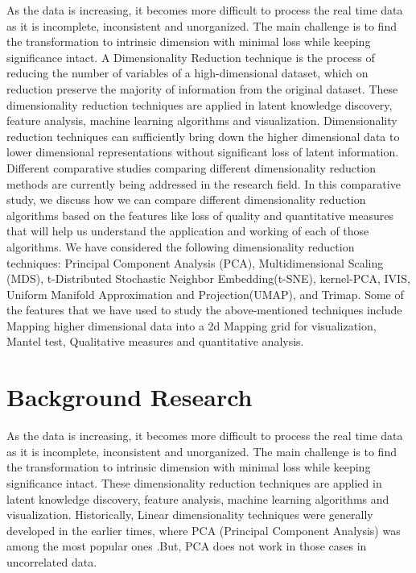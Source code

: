 \documentclass[letterpaper, 10 pt, conference]{ieeeconf}  %
\begin{document}
As the data is increasing, it becomes more difficult to process the real time data as it is incomplete, inconsistent and unorganized. The main challenge is to find the transformation to intrinsic dimension with minimal loss while keeping significance intact. A Dimensionality Reduction technique is the process of reducing the number of variables of a high-dimensional dataset, which on reduction preserve the majority of information from the original dataset. These dimensionality reduction techniques are applied in latent knowledge discovery, feature analysis, machine learning algorithms and visualization. Dimensionality reduction techniques can sufficiently bring down the higher dimensional data to lower dimensional representations without significant loss of latent information. Different comparative studies comparing different dimensionality reduction methods are currently being addressed in the research field. 
In this comparative study, we discuss how we can compare different dimensionality reduction algorithms based on the features like loss of quality and quantitative measures that will help us understand the application and working of each of those algorithms. We have considered the following dimensionality reduction techniques: Principal Component Analysis (PCA), Multidimensional Scaling (MDS), t-Distributed Stochastic Neighbor Embedding(t-SNE), kernel-PCA, IVIS, Uniform Manifold Approximation and Projection(UMAP), and Trimap. Some of the features that we have used to study the above-mentioned techniques include Mapping higher dimensional data into a 2d Mapping grid for visualization, Mantel test, Qualitative measures and quantitative analysis. 


\section{Background Research}

As the data is increasing, it becomes more difficult to process the real time data as it is incomplete,
inconsistent and unorganized. The main challenge is to find the transformation to intrinsic dimension with
minimal loss while keeping significance intact. These dimensionality reduction techniques are applied in
latent knowledge discovery, feature analysis, machine learning algorithms and visualization. Historically,
Linear dimensionality techniques were generally developed in the earlier times, where PCA (Principal
Component Analysis) was among the most popular ones .But, PCA does not work in those cases in
uncorrelated data.
\end{document}
